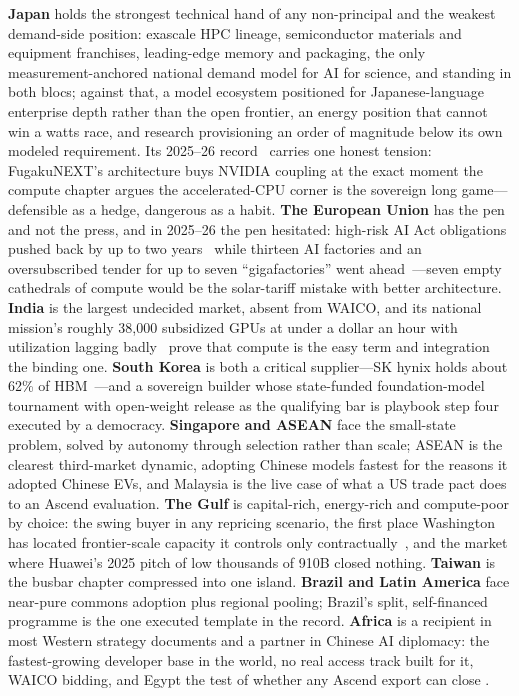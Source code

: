 \textbf{Japan} holds the strongest technical hand of any non-principal and the weakest demand-side position: exascale HPC lineage, semiconductor materials and equipment franchises, leading-edge memory and packaging, the only measurement-anchored national demand model for AI for science, and standing in both blocs; against that, a model ecosystem positioned for Japanese-language enterprise depth rather than the open frontier, an energy position that cannot win a watts race, and research provisioning an order of magnitude below its own modeled requirement. Its 2025--26 record~\cite{japan-ai-act} carries one honest tension: FugakuNEXT's architecture buys NVIDIA coupling at the exact moment the compute chapter argues the accelerated-CPU corner is the sovereign long game---defensible as a hedge, dangerous as a habit. \textbf{The European Union} has the pen and not the press, and in 2025--26 the pen hesitated: high-risk AI Act obligations pushed back by up to two years~\cite{eu-omnibus} while thirteen AI factories and an oversubscribed tender for up to seven ``gigafactories'' went ahead~\cite{eu-gigafactories,eu-giga-tender}---seven empty cathedrals of compute would be the solar-tariff mistake with better architecture. \textbf{India} is the largest undecided market, absent from WAICO, and its national mission's roughly 38,000 subsidized GPUs at under a dollar an hour with utilization lagging badly~\cite{indiaai} prove that compute is the easy term and integration the binding one. \textbf{South Korea} is both a critical supplier---SK hynix holds about 62\% of HBM~\cite{korea-hbm}---and a sovereign builder whose state-funded foundation-model tournament with open-weight release as the qualifying bar is playbook step four executed by a democracy. \textbf{Singapore and ASEAN} face the small-state problem, solved by autonomy through selection rather than scale; ASEAN is the clearest third-market dynamic, adopting Chinese models fastest for the reasons it adopted Chinese EVs, and Malaysia is the live case of what a US trade pact does to an Ascend evaluation. \textbf{The Gulf} is capital-rich, energy-rich and compute-poor by choice: the swing buyer in any repricing scenario, the first place Washington has located frontier-scale capacity it controls only contractually~\cite{gulf-ai}, and the market where Huawei's 2025 pitch of low thousands of 910B closed nothing. \textbf{Taiwan} is the busbar chapter compressed into one island. \textbf{Brazil and Latin America} face near-pure commons adoption plus regional pooling; Brazil's split, self-financed programme is the one executed template in the record. \textbf{Africa} is a recipient in most Western strategy documents and a partner in Chinese AI diplomacy: the fastest-growing developer base in the world, no real access track built for it, WAICO bidding, and Egypt the test of whether any Ascend export can close .

